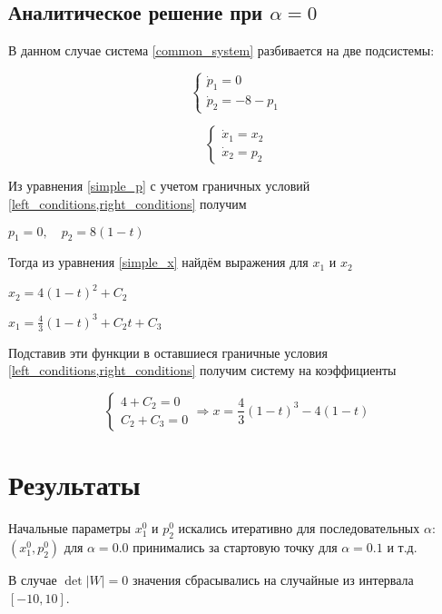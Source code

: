 \documentclass[a4paper,12pt]{article}
\begin{document}
\subsection*{Аналитическое решение при
\(\alpha=0\)}

В данном случае система \cref{common_system} разбивается на две подсистемы:

\begin{equation}
  \label{simple_x}
  \begin{cases}
    \dot{p}_1=0\\
    \dot{p}_2=-8-p_1
  \end{cases}
\end{equation}

\begin{equation}
  \label{simple_p}
  \begin{cases}
    \dot{x}_1=x_2\\
    \dot{x}_2=p_2
  \end{cases}
\end{equation}

Из уравнения \cref{simple_p} с учетом граничных условий \cref{left_conditions,right_conditions} получим

\(p_1=0, \quad p_2=8\left(1-t\right)\)

Тогда из уравнения \cref{simple_x} найдём выражения для \(x_1\) и \(x_2\)

\(x_2=4\left(1-t\right)^2+C_2\)

\(x_1=\frac{4}{3}\left(1-t\right)^3+C_2 t+C_3\)

Подставив эти функции в оставшиеся граничные условия \cref{left_conditions,right_conditions} получим систему на коэффициенты

\begin{equation*}
  \begin{cases}
    4+C_2=0\\
    C_2+C_3=0
  \end{cases} \Rightarrow x=\frac{4}{3}\left(1-t\right)^3-4 (1-t)
\end{equation*}

\section*{Результаты}
Начальные параметры \(x_1^0\) и \(p_2^0\) искались итеративно для последовательных \(\alpha\): \(\left(x_1^0, p_2^0\right)\) для \(\alpha=0.0\) принимались за стартовую точку для \(\alpha=0.1\) и т.д. 

В случае \(\det\vert W\vert=0\) значения сбрасывались на случайные из интервала \([-10, 10]\).
\end{document}

